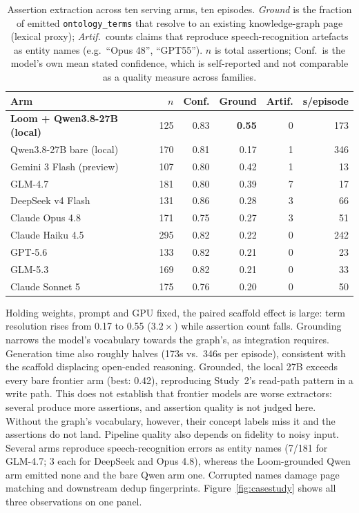 \documentclass[10pt,twocolumn]{article}
\begin{document}
\begin{table}[t]\centering\small
\caption{Assertion extraction across ten serving arms, ten episodes. \emph{Ground}
is the fraction of emitted \texttt{ontology\_terms} that resolve to an existing knowledge-graph
page (lexical proxy); \emph{Artif.}\ counts claims that reproduce speech-recognition artefacts as
entity names (e.g.\ ``Opus 48'', ``GPT55''). $n$ is total assertions; Conf.\ is the model's own
mean stated confidence, which is self-reported and not comparable as a quality measure across
families.}
\label{tab:casestudy}
\renewcommand{\arraystretch}{1.15}
\begin{tabular}{@{}lrrrrr@{}}
\toprule
Arm & $n$ & Conf. & Ground & Artif. & s/episode \\
\midrule
\textbf{Loom + Qwen3.8-27B (local)} & 125 & 0.83 & \textbf{0.55} & 0 & 173 \\
Qwen3.8-27B bare (local)            & 170 & 0.81 & 0.17 & 1 & 346 \\
\midrule
Gemini 3 Flash (preview)            & 107 & 0.80 & 0.42 & 1 & 13 \\
GLM-4.7                             & 181 & 0.80 & 0.39 & 7 & 17 \\
DeepSeek v4 Flash                   & 131 & 0.86 & 0.28 & 3 & 66 \\
Claude Opus 4.8                     & 171 & 0.75 & 0.27 & 3 & 51 \\
Claude Haiku 4.5                    & 295 & 0.82 & 0.22 & 0 & 242 \\
GPT-5.6                             & 133 & 0.82 & 0.21 & 0 & 23 \\
GLM-5.3                             & 169 & 0.82 & 0.21 & 0 & 33 \\
Claude Sonnet 5                     & 175 & 0.76 & 0.20 & 0 & 50 \\
\bottomrule
\end{tabular}
\end{table}

Holding weights, prompt and GPU fixed, the paired scaffold effect is large: term resolution
rises from 0.17 to 0.55 ($3.2\times$) while assertion count falls. Grounding narrows the model's
vocabulary towards the graph's, as integration requires. Generation time also roughly halves
(173s vs.\ 346s per episode), consistent with the scaffold displacing open-ended reasoning.
Grounded, the local 27B exceeds every bare frontier arm (best: 0.42), reproducing Study~2's
read-path pattern in a write path. This does not establish that frontier models are worse
extractors: several produce more assertions, and assertion quality is not judged here. Without
the graph's vocabulary, however, their concept labels miss it and the assertions do not land.
Pipeline quality also depends on fidelity to noisy input. Several arms reproduce speech-recognition
errors as entity names (7/181 for GLM-4.7; 3 each for DeepSeek and Opus 4.8), whereas the
Loom-grounded Qwen arm emitted none and the bare Qwen arm one. Corrupted names damage page matching and downstream dedup
fingerprints. Figure~\ref{fig:casestudy} shows all three observations on one panel.
\end{document}
